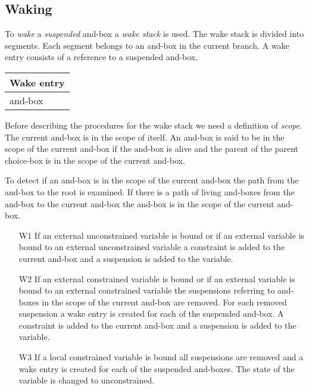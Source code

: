\subsection*{Waking}

To {\em wake} a {\em suspended} and-box a {\em wake stack} is used. The
wake stack is divided into segments. Each segment belongs to an and-box
in the current branch. A wake entry consists of a reference to a suspended 
and-box.

\begin{center} \begin{tabular}{|l|}\hline
Wake entry \\
\hline
\hline
and-box\\
\hline
\end{tabular} \end{center}

Before describing the procedures for the wake stack we need a
definition of {\em scope}. The current and-box is in the scope of
itself. An and-box is said to be in the scope of the current and-box
if the and-box is alive and the parent of the parent choice-box is in
the scope of the current and-box.

To detect if an and-box is in the scope of the current and-box the
path from the and-box to the root is examined. If there is a path of
living and-boxes from the and-box to the current and-box the and-box is 
in the scope of the current and-box.


\begin{itemize}

\item[W1] If an external unconstrained variable is bound or if an
external variable is bound to an external unconstrained variable a
constraint is added to the current and-box and a suspension is added
to the variable.

\item[W2] If an external constrained variable is bound or if an external 
variable is bound to an external constrained variable the suspensions
referring to and-boxes in the scope of the current and-box are
removed. For each removed suspension a wake entry is created for each
of the suspended and-box.  A constraint is added to the current
and-box and a suspension is added to the variable.

\item[W3] If a local constrained variable is bound 
all suspensions are removed and a wake entry is
created for each of the suspended and-boxes. The state of the variable is
changed to unconstrained.

\end{itemize}

